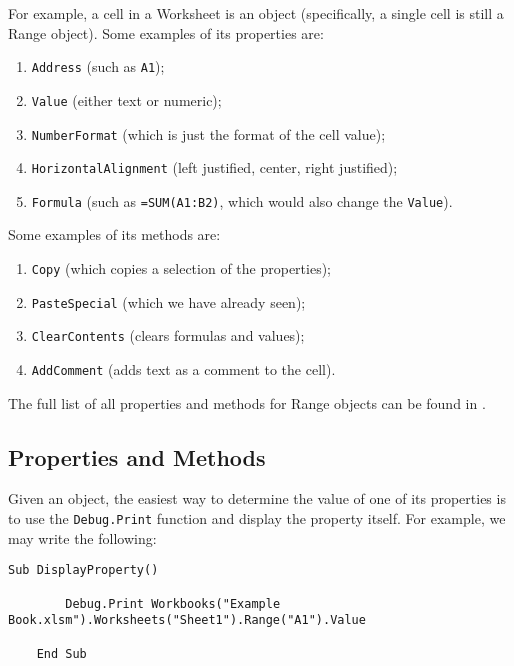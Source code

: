 \documentclass[11pt]{article}%
\begin{document}
For example, a cell in a Worksheet is an object (specifically, a single cell is still a Range object). Some examples of its properties are:

\begin{enumerate}
    \item \texttt{Address} (such as \texttt{A1});
    \item \texttt{Value} (either text or numeric);
    \item \texttt{NumberFormat} (which is just the format of the cell value);
    \item \texttt{HorizontalAlignment} (left justified, center, right justified);
    \item \texttt{Formula} (such as \texttt{=SUM(A1:B2)}, which would also change the \texttt{Value}).
\end{enumerate}

Some examples of its methods are:

\begin{enumerate}
    \item \texttt{Copy} (which copies a selection of the properties);
    \item \texttt{PasteSpecial} (which we have already seen);
    \item \texttt{ClearContents} (clears formulas and values);
    \item \texttt{AddComment} (adds text as a comment to the cell).
\end{enumerate}

The full list of all properties and methods for Range objects can be found in \cite{CellsPropsAndMethods}.


\subsection{Properties and Methods}

Given an object, the easiest way to determine the value of one of its properties is to use the \texttt{Debug.Print} function and display the property itself. For example, we may write the following:\\

\begin{lstlisting}[style=A]
    Sub DisplayProperty()

        Debug.Print Workbooks("Example Book.xlsm").Worksheets("Sheet1").Range("A1").Value

    End Sub
\end{lstlisting}
\end{document}
